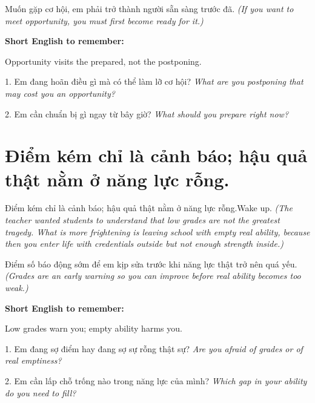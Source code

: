 \begin{baihoc}
Muốn gặp cơ hội, em phải trở thành người sẵn sàng trước đã.
\textit{(If you want to meet opportunity, you must first become ready for it.)}
\end{baihoc}

\begin{ghinhoanh}
\textbf{Short English to remember:}

Opportunity visits the prepared, not the postponing.

\end{ghinhoanh}

\begin{tuhocnhanh}
1. Em đang hoãn điều gì mà có thể làm lỡ cơ hội? \textit{What are you postponing that may cost you an opportunity?}

2. Em cần chuẩn bị gì ngay từ bây giờ? \textit{What should you prepare right now?}
\end{tuhocnhanh}
\ngancach

\section{Điểm kém chỉ là cảnh báo; hậu quả thật nằm ở năng lực rỗng.}
\begin{truyen}{Điểm kém chỉ là cảnh báo; hậu quả thật nằm ở năng lực rỗng.}{Wake up.}
\textit{(The teacher wanted students to understand that low grades are not the greatest tragedy. What is more frightening is leaving school with empty real ability, because then you enter life with credentials outside but not enough strength inside.)}
\end{truyen}

\begin{baihoc}
Điểm số báo động sớm để em kịp sửa trước khi năng lực thật trở nên quá yếu.
\textit{(Grades are an early warning so you can improve before real ability becomes too weak.)}
\end{baihoc}

\begin{ghinhoanh}
\textbf{Short English to remember:}

Low grades warn you; empty ability harms you.

\end{ghinhoanh}

\begin{tuhocnhanh}
1. Em đang sợ điểm hay đang sợ sự rỗng thật sự? \textit{Are you afraid of grades or of real emptiness?}

2. Em cần lấp chỗ trống nào trong năng lực của mình? \textit{Which gap in your ability do you need to fill?}
\end{tuhocnhanh}
\ngancach

